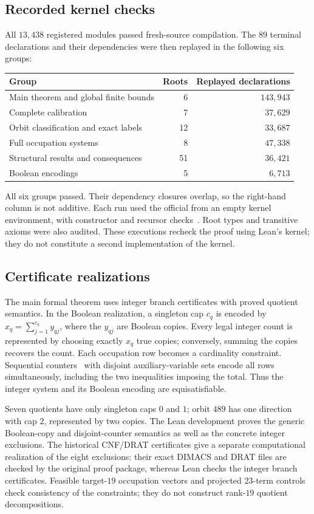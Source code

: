 \subsection{Recorded kernel checks}
All $13{,}438$ registered modules passed fresh-source compilation.
The $89$ terminal declarations and their dependencies were then replayed
in the following six groups:
\begin{center}
\begin{tabular}{lrr}
\toprule
Group & Roots & Replayed declarations\\
\midrule
Main theorem and global finite bounds & 6 & $143{,}943$\\
Complete calibration & 7 & $37{,}629$\\
Orbit classification and exact labels & 12 & $33{,}687$\\
Full occupation systems & 8 & $47{,}338$\\
Structural results and consequences & 51 & $36{,}421$\\
Boolean encodings & 5 & $6{,}713$\\
\bottomrule
\end{tabular}
\end{center}
All six groups passed. Their dependency closures overlap, so the
right-hand column is not additive.
Each run used the official
 from an empty kernel environment,
with constructor and recursor checks~\cite{lean-replay}.
Root types and transitive axioms were also audited.
These executions recheck the proof using Lean's kernel; they do not
constitute a second implementation of the kernel.

\subsection{Certificate realizations}\label{app:certificate-realizations}
The main formal theorem uses integer branch certificates with
proved quotient semantics. In the Boolean realization, a singleton
cap $c_q$ is encoded by $x_q=\sum_{j=1}^{c_q}y_{qj}$, where the
$y_{qj}$ are Boolean copies. Every legal integer count is represented
by choosing exactly $x_q$ true copies; conversely, summing the copies
recovers the count. Each occupation row becomes a cardinality
constraint. Sequential counters~\cite{sinz} with disjoint
auxiliary-variable sets encode all rows simultaneously, including
the two inequalities imposing the total. Thus the integer system
and its Boolean encoding are equisatisfiable.

Seven quotients have only singleton caps $0$ and $1$; orbit $489$
has one direction with cap $2$, represented by two copies. The Lean
development proves the generic Boolean-copy and disjoint-counter
semantics as well as the concrete integer exclusions. The historical
CNF/DRAT certificates give a separate computational realization of
the eight exclusions: their exact DIMACS and DRAT files are checked
by the original proof package, whereas Lean checks the integer
branch certificates. Feasible target-$19$ occupation vectors and
projected $23$-term controls check consistency of the constraints;
they do not construct rank-$19$ quotient decompositions.

